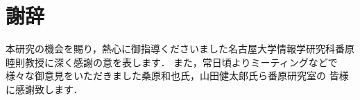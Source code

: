 \chapter*{謝辞}

本研究の機会を賜り，熱心に御指導くださいました名古屋大学情報学研究科番原睦則教授に深く感謝の意を表します．
また，常日頃よりミーティングなどで様々な御意見をいただきました桑原和也氏，山田健太郎氏ら番原研究室の
皆様に感謝致します．

